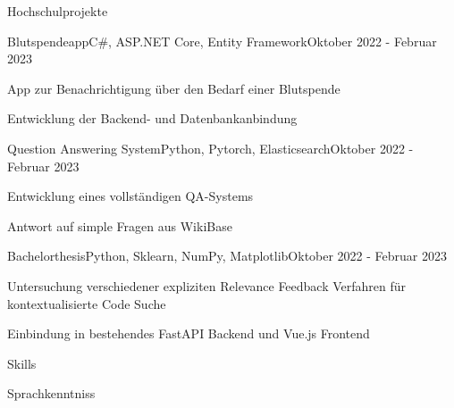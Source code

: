 \documentclass{resume}
\begin{document}
\begin{cvsection}{Hochschulprojekte}
  \begin{cvproject}
  {Blutspendeapp}{C\#, ASP.NET Core, Entity Framework}{Oktober 2022 - Februar 2023}
	\item App zur Benachrichtigung über den Bedarf einer Blutspende
	\item Entwicklung der Backend- und Datenbankanbindung
  \end{cvproject}
  \begin{cvproject}
  {Question Answering System}{Python, Pytorch, Elasticsearch}{Oktober 2022 - Februar 2023}
	\item Entwicklung eines vollst\"andigen QA-Systems
	\item Antwort auf simple Fragen aus WikiBase
  \end{cvproject}
  \begin{cvproject}
  {Bachelorthesis}{Python, Sklearn, NumPy, Matplotlib}{Oktober 2022 - Februar 2023}
	\item Untersuchung verschiedener expliziten Relevance Feedback Verfahren f\"ur kontextualisierte Code Suche
	\item Einbindung in bestehendes FastAPI Backend und Vue.js Frontend
  \end{cvproject}
\end{cvsection}


\begin{cvsection}{Skills}
  \begin{cvskills}
  \end{cvskills}
\end{cvsection}


\begin{cvsection}{Sprachkenntniss}
  \begin{cvskills}
  \end{cvskills}
\end{cvsection}
\end{document}
